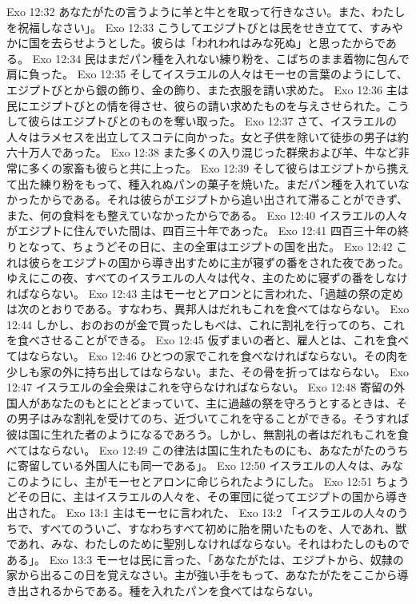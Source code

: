 Exo 12:32  あなたがたの言うように羊と牛とを取って行きなさい。また、わたしを祝福しなさい」。
Exo 12:33  こうしてエジプトびとは民をせき立てて、すみやかに国を去らせようとした。彼らは「われわれはみな死ぬ」と思ったからである。
Exo 12:34  民はまだパン種を入れない練り粉を、こばちのまま着物に包んで肩に負った。
Exo 12:35  そしてイスラエルの人々はモーセの言葉のようにして、エジプトびとから銀の飾り、金の飾り、また衣服を請い求めた。
Exo 12:36  主は民にエジプトびとの情を得させ、彼らの請い求めたものを与えさせられた。こうして彼らはエジプトびとのものを奪い取った。
Exo 12:37  さて、イスラエルの人々はラメセスを出立してスコテに向かった。女と子供を除いて徒歩の男子は約六十万人であった。
Exo 12:38  また多くの入り混じった群衆および羊、牛など非常に多くの家畜も彼らと共に上った。
Exo 12:39  そして彼らはエジプトから携えて出た練り粉をもって、種入れぬパンの菓子を焼いた。まだパン種を入れていなかったからである。それは彼らがエジプトから追い出されて滞ることができず、また、何の食料をも整えていなかったからである。
Exo 12:40  イスラエルの人々がエジプトに住んでいた間は、四百三十年であった。
Exo 12:41  四百三十年の終りとなって、ちょうどその日に、主の全軍はエジプトの国を出た。
Exo 12:42  これは彼らをエジプトの国から導き出すために主が寝ずの番をされた夜であった。ゆえにこの夜、すべてのイスラエルの人々は代々、主のために寝ずの番をしなければならない。
Exo 12:43  主はモーセとアロンとに言われた、「過越の祭の定めは次のとおりである。すなわち、異邦人はだれもこれを食べてはならない。
Exo 12:44  しかし、おのおのが金で買ったしもべは、これに割礼を行ってのち、これを食べさせることができる。
Exo 12:45  仮ずまいの者と、雇人とは、これを食べてはならない。
Exo 12:46  ひとつの家でこれを食べなければならない。その肉を少しも家の外に持ち出してはならない。また、その骨を折ってはならない。
Exo 12:47  イスラエルの全会衆はこれを守らなければならない。
Exo 12:48  寄留の外国人があなたのもとにとどまっていて、主に過越の祭を守ろうとするときは、その男子はみな割礼を受けてのち、近づいてこれを守ることができる。そうすれば彼は国に生れた者のようになるであろう。しかし、無割礼の者はだれもこれを食べてはならない。
Exo 12:49  この律法は国に生れたものにも、あなたがたのうちに寄留している外国人にも同一である」。
Exo 12:50  イスラエルの人々は、みなこのようにし、主がモーセとアロンに命じられたようにした。
Exo 12:51  ちょうどその日に、主はイスラエルの人々を、その軍団に従ってエジプトの国から導き出された。
Exo 13:1  主はモーセに言われた、
Exo 13:2  「イスラエルの人々のうちで、すべてのういご、すなわちすべて初めに胎を開いたものを、人であれ、獣であれ、みな、わたしのために聖別しなければならない。それはわたしのものである」。
Exo 13:3  モーセは民に言った、「あなたがたは、エジプトから、奴隷の家から出るこの日を覚えなさい。主が強い手をもって、あなたがたをここから導き出されるからである。種を入れたパンを食べてはならない。
